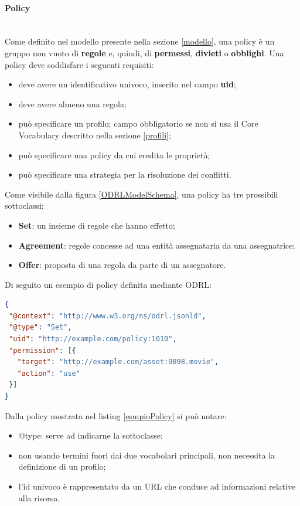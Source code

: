 \documentclass[12pt,a4paper,twoside]{book}
\begin{document}
\paragraph{Policy}\mbox{}\\
Come definito nel modello presente nella sezione \ref{modello}, una policy è un gruppo non vuoto di \textbf{regole} e, quindi, di \textbf{permessi}, \textbf{divieti} o \textbf{obblighi}. Una policy deve soddisfare i seguenti requisiti:
\begin{itemize}
	\item deve avere un identificativo univoco, inserito nel campo \textbf{uid};
	\item deve avere almeno una regola;
	\item può specificare un profilo; campo obbligatorio se non si usa il Core Vocabulary descritto nella sezione \ref{profili};
	\item può specificare una policy da cui eredita le proprietà;
	\item può specificare una strategia per la risoluzione dei conflitti.
\end{itemize}
Come visibile dalla figura \ref{ODRLModelSchema}, una policy ha tre prossibili sottoclassi:
\begin{itemize}
	\item \textbf{Set}: un insieme di regole che hanno effetto;
	\item \textbf{Agreement}: regole concesse ad una entità assegnataria da una assegnatrice;
	\item \textbf{Offer}: proposta di una regola da parte di un assegnatore.
\end{itemize}
Di seguito un esempio di policy definita mediante ODRL:
\begin{lstlisting}[language=json,firstnumber=1,caption={Policy con sottoclasse \textbf{Set}},captionpos=b,label=esmpioPolicy]
{
 "@context": "http://www.w3.org/ns/odrl.jsonld",
 "@type": "Set",
 "uid": "http://example.com/policy:1010",
 "permission": [{
   "target": "http://example.com/asset:9898.movie",
   "action": "use"
 }]
}
\end{lstlisting}
Dalla policy mostrata nel listing \ref{esmpioPolicy} si può notare:
\begin{itemize}
	\item @type: serve ad indicarne la sottoclasse;
	\item non usando termini fuori dai due vocabolari principali, non necessita la definizione di un profilo;
	\item l'id univoco è rappresentato da un URL che conduce ad informazioni relative alla risorsa.
\end{itemize}
\end{document}

